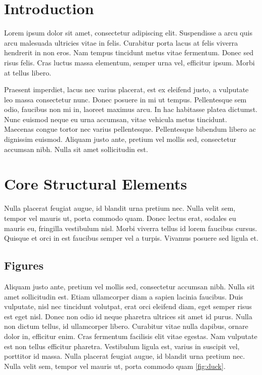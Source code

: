\documentclass[sigconf, nonacm]{acmart}
\begin{document}
\vldbtopmatter

\section{Introduction}

Lorem ipsum dolor sit amet, consectetur adipiscing elit. Suspendisse a arcu quis arcu malesuada ultricies vitae in felis. Curabitur porta lacus at felis viverra hendrerit in non eros. Nam tempus tincidunt metus vitae fermentum. Donec sed risus felis. Cras luctus massa elementum, semper urna vel, efficitur ipsum. Morbi at tellus libero.

Praesent imperdiet, lacus nec varius placerat, est ex eleifend justo, a vulputate leo massa consectetur nunc. Donec posuere in mi ut tempus. Pellentesque sem odio, faucibus non mi in, laoreet maximus arcu. In hac habitasse platea dictumst. Nunc euismod neque eu urna accumsan, vitae vehicula metus tincidunt. Maecenas congue tortor nec varius pellentesque. Pellentesque bibendum libero ac dignissim euismod. Aliquam justo ante, pretium vel mollis sed, consectetur accumsan nibh. Nulla sit amet sollicitudin est. 

\section{Core Structural Elements}

Nulla placerat feugiat augue, id blandit urna pretium nec. Nulla velit sem, tempor vel mauris ut, porta commodo quam. Donec lectus erat, sodales eu mauris eu, fringilla vestibulum nisl. Morbi viverra tellus id lorem faucibus cursus. Quisque et orci in est faucibus semper vel a turpis. Vivamus posuere sed ligula et. 

\subsection{Figures}

Aliquam justo ante, pretium vel mollis sed, consectetur accumsan nibh. Nulla sit amet sollicitudin est. Etiam ullamcorper diam a sapien lacinia faucibus. Duis vulputate, nisl nec tincidunt volutpat, erat orci eleifend diam, eget semper risus est eget nisl. Donec non odio id neque pharetra ultrices sit amet id purus. Nulla non dictum tellus, id ullamcorper libero. Curabitur vitae nulla dapibus, ornare dolor in, efficitur enim. Cras fermentum facilisis elit vitae egestas. Nam vulputate est non tellus efficitur pharetra. Vestibulum ligula est, varius in suscipit vel, porttitor id massa. Nulla placerat feugiat augue, id blandit urna pretium nec. Nulla velit sem, tempor vel mauris ut, porta commodo quam \autoref{fig:duck}.
\end{document}
